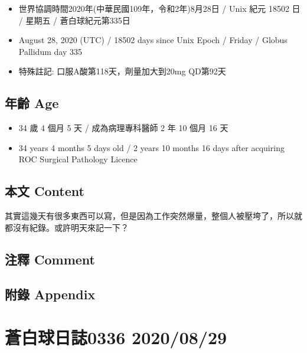 \documentclass[
]{article}
\providecommand{\tightlist}{%
  \setlength{\itemsep}{0pt}\setlength{\parskip}{0pt}}
\begin{document}
\begin{itemize}
\tightlist
\item
  世界協調時間2020年(中華民國109年，令和2年)8月28日 / Unix 紀元 18502 日
  / 星期五 / 蒼白球紀元第335日
\item
  August 28, 2020 (UTC) / 18502 days since Unix Epoch / Friday / Globus
  Pallidum day 335
\item
  特殊註記: 口服A酸第118天，劑量加大到20mg QD第92天
\end{itemize}

\hypertarget{ux5e74ux9f61-age-27}{%
\subsection{年齡 Age}\label{ux5e74ux9f61-age-27}}

\begin{itemize}
\tightlist
\item
  34 歲 4 個月 5 天 / 成為病理專科醫師 2 年 10 個月 16 天
\item
  34 years 4 months 5 days old / 2 years 10 months 16 days after
  acquiring ROC Surgical Pathology Licence
\end{itemize}

\hypertarget{ux672cux6587-content-27}{%
\subsection{本文 Content}\label{ux672cux6587-content-27}}

其實這幾天有很多東西可以寫，但是因為工作突然爆量，整個人被壓垮了，所以就都沒有紀錄。或許明天來記一下？

\hypertarget{ux6ce8ux91cb-comment-27}{%
\subsection{注釋 Comment}\label{ux6ce8ux91cb-comment-27}}

\hypertarget{ux9644ux9304-appendix-27}{%
\subsection{附錄 Appendix}\label{ux9644ux9304-appendix-27}}

\hypertarget{ux84bcux767dux7403ux65e5ux8a8c0336-20200829}{%
\section{蒼白球日誌0336
2020/08/29}\label{ux84bcux767dux7403ux65e5ux8a8c0336-20200829}}
\end{document}
